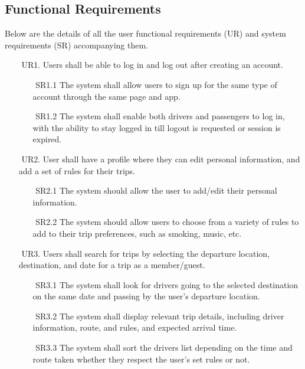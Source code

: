 \documentclass[a4paper, 12pt]{report} %
\begin{document}
        \subsection{Functional Requirements}
            Below are the details of all the user functional requirements (UR) and system requirements (SR) accompanying them.
           \begin{itemize}
                \item [$ $] UR1. Users shall be able to log in and log out after creating an account.
                \begin{itemize}
                    \item [$ $]SR1.1 The system shall allow users to sign up for the same type of account through the same page and app.
                    \item [$ $]SR1.2 The system shall enable both drivers and passengers to log in, with the ability to stay logged in till logout is requested or session is expired.
                \end{itemize}
                \item [$ $] UR2. User shall have a profile where they can edit personal information, and add a set of rules for their trips.
                \begin{itemize}
                    \item [$ $] SR2.1 The system should allow the user to add/edit their personal information.
                    \item [$ $] SR2.2 The system should allow users to choose from a variety of rules to add to their trip preferences, such as smoking, music, etc.
                \end{itemize}
                \item [$ $] UR3. Users shall search for trips by selecting the departure location, destination, and date for a trip as a member/guest.
                \begin{itemize}
                    \item [$ $] SR3.1 The system shall look for drivers going to the selected destination on the same date and passing by the user’s departure location.
                    \item [$ $] SR3.2 The system shall display relevant trip details, including driver information, route, and rules, and expected arrival time. 
                    \item [$ $] SR3.3 The system shall sort the drivers list depending on the time and route taken whether they respect the user’s set rules or not.

\end{itemize}
\end{itemize}
\end{document}
